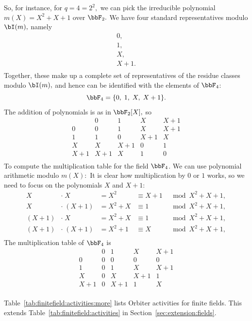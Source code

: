 So, for instance, for $q = 4 = 2^2,$ 
we can pick the irreducible polynomial 
$m(X) = X^2+X+1$ over $\bbF_2.$ 
We have four standard representatives modulo $\bI(m),$ namely
$$
\begin{array}{c}
0, \\
1, \\
X, \\
X + 1.\\
\end{array}
$$
Together, these make up a complete set 
of representatives of the residue classes modulo  $\bI(m),$ 
and hence can be identified with the elements of $\bbF_4$:
$$
\bbF_4 = \{0, \; 1, \; X, \; X+1 \}.
$$
The addition of polynomials is as in $\bbF_2[X],$ so 
$$
\begin{array}{c|cccc}
 & 0 & 1 & X & X + 1 \\
\hline
0 & 0 & 1 & X & X + 1\\
1 & 1 & 0 & X+1 & X \\
X & X & X + 1 & 0 & 1 \\
X + 1 & X + 1 & X & 1 & 0 \\
\end{array}
$$
To compute the multiplication table for the field $\bbF_4$.
We can use polynomial arithmetic modulo $m(X):$
It is clear how multiplication 
by $0$ or $1$ works, so we need to focus on the 
polynomials $X$ and $X+1$:
$$
\begin{array}{lllll}
X &\cdot\; X &= X^2 &\equiv X + 1 &\mod X^2 + X + 1, \\
X &\cdot\; (X+1) &= X^2+X &\equiv 1 &\mod X^2 + X + 1, \\
(X+1) &\cdot\; X &= X^2+X &\equiv 1 &\mod X^2 + X + 1, \\
(X+1) &\cdot\; (X+1) &= X^2+1 &\equiv X &\mod X^2 + X + 1, \\
\end{array}
$$
The multiplication table of $\bbF_4$ is
$$
\begin{array}{c|cccc}
 & 0 & 1 & X & X + 1 \\
\hline
0     & 0 & 0   & 0 & 0\\
1     & 0 & 1   & X & X+1 \\
X     & 0 & X   & X+1 & 1 \\
X + 1 & 0 & X+1 & 1 & X \\
\end{array}
$$

\bigskip

Table~\ref{tab:finitefield:activities:more} 
lists Orbiter activities for finite fields. 
This extends Table~\ref{tab:finitefield:activities} in Section~\ref{sec:extension:fields}.  


